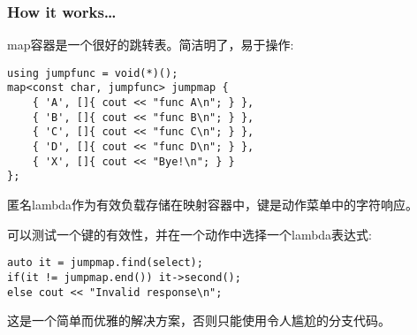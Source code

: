 \subsubsection{How it works…}

map容器是一个很好的跳转表。简洁明了，易于操作:

\begin{lstlisting}[style=styleCXX]
using jumpfunc = void(*)();
map<const char, jumpfunc> jumpmap {
	{ 'A', []{ cout << "func A\n"; } },
	{ 'B', []{ cout << "func B\n"; } },
	{ 'C', []{ cout << "func C\n"; } },
	{ 'D', []{ cout << "func D\n"; } },
	{ 'X', []{ cout << "Bye!\n"; } }
};
\end{lstlisting}

匿名lambda作为有效负载存储在映射容器中，键是动作菜单中的字符响应。

可以测试一个键的有效性，并在一个动作中选择一个lambda表达式:

\begin{lstlisting}[style=styleCXX]
auto it = jumpmap.find(select);
if(it != jumpmap.end()) it->second();
else cout << "Invalid response\n";
\end{lstlisting}

这是一个简单而优雅的解决方案，否则只能使用令人尴尬的分支代码。









